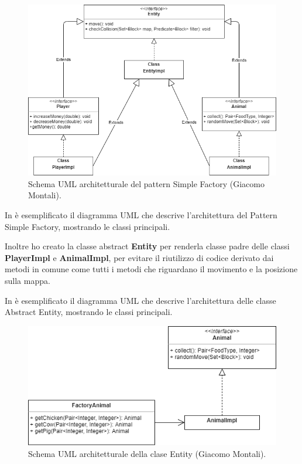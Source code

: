\documentclass[a4paper,12pt]{report}
\begin{document}
\begin{figure}[!htb]
	\centering{}
	\includegraphics[width=\textwidth]{img/UML_AbstractMonta.png}
	\caption{Schema UML architetturale del pattern Simple Factory (Giacomo Montali).}
	\label{img:GiacomoMontali_Factory}
\end{figure}

In  è esemplificato il diagramma UML che descrive l'architettura del Pattern Simple Factory, mostrando le classi principali.

Inoltre ho creato la classe abstract \textbf{Entity} per renderla classe padre delle classi \textbf{PlayerImpl} e \textbf{AnimalImpl}, per evitare il riutilizzo di codice derivato dai metodi in comune come tutti i metodi che riguardano il movimento e la posizione sulla mappa.

In  è esemplificato il diagramma UML che descrive l'architettura delle classe Abstract Entity, mostrando le classi principali.

\hfill\break
\begin{figure}[!htb]
	\centering{}
	\includegraphics[width=\textwidth]{img/UML_FactoryMonta.png}
	\caption{Schema UML architetturale della clase Entity (Giacomo Montali).}
	\label{img:GiacomoMontali_Abstract}
\end{figure}
\end{document}
